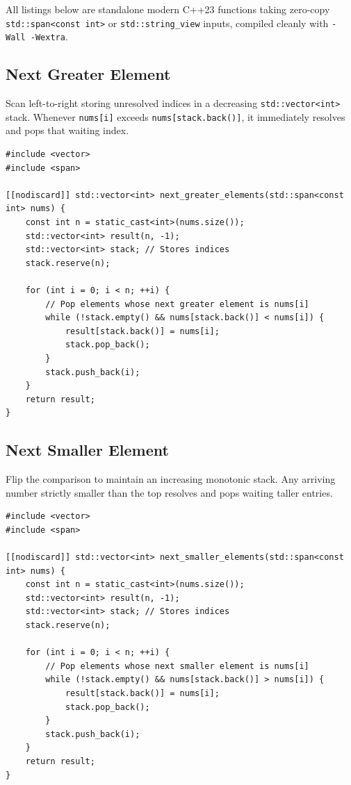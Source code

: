 \documentclass[11pt,a4paper]{article}
\theoremstyle{definition}
\begin{document}
All listings below are standalone modern C++23 functions taking zero-copy \texttt{std::span<const int>} or \texttt{std::string\_view} inputs, compiled cleanly with \texttt{-Wall -Wextra}.

\subsection{Next Greater Element}

Scan left-to-right storing unresolved indices in a decreasing \texttt{std::vector<int>} stack. Whenever \texttt{nums[i]} exceeds \texttt{nums[stack.back()]}, it immediately resolves and pops that waiting index.

\begin{lstlisting}[caption=Next Greater Element in C++23]
#include <vector>
#include <span>

[[nodiscard]] std::vector<int> next_greater_elements(std::span<const int> nums) {
    const int n = static_cast<int>(nums.size());
    std::vector<int> result(n, -1);
    std::vector<int> stack; // Stores indices
    stack.reserve(n);

    for (int i = 0; i < n; ++i) {
        // Pop elements whose next greater element is nums[i]
        while (!stack.empty() && nums[stack.back()] < nums[i]) {
            result[stack.back()] = nums[i];
            stack.pop_back();
        }
        stack.push_back(i);
    }
    return result;
}
\end{lstlisting}

\subsection{Next Smaller Element}

Flip the comparison to maintain an increasing monotonic stack. Any arriving number strictly smaller than the top resolves and pops waiting taller entries.

\begin{lstlisting}[caption=Next Smaller Element in C++23]
#include <vector>
#include <span>

[[nodiscard]] std::vector<int> next_smaller_elements(std::span<const int> nums) {
    const int n = static_cast<int>(nums.size());
    std::vector<int> result(n, -1);
    std::vector<int> stack; // Stores indices
    stack.reserve(n);

    for (int i = 0; i < n; ++i) {
        // Pop elements whose next smaller element is nums[i]
        while (!stack.empty() && nums[stack.back()] > nums[i]) {
            result[stack.back()] = nums[i];
            stack.pop_back();
        }
        stack.push_back(i);
    }
    return result;
}
\end{lstlisting}
\end{document}

